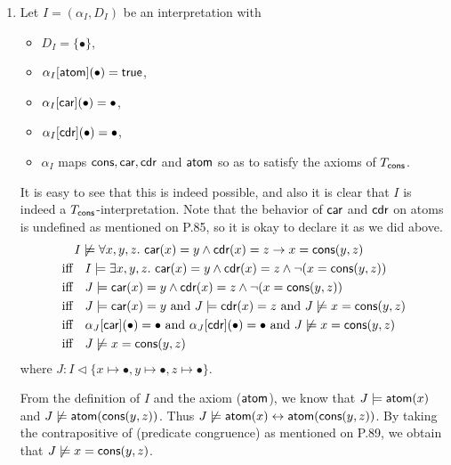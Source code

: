 \begin{exer}[3.4]
    $ $
    \begin{enumerate}[label=(\alph*)]
        \item
            Let $I = (\alpha_I, D_I)$ be an interpretation with
            \begin{itemize}
                \item
                    $D_I = \{ \bullet \}$,
                \item
                    $\alpha_I[\operatorname{\textsf{atom}}](\bullet) = \operatorname{\textsf{true}}$,
                \item
                    $\alpha_I[\operatorname{\textsf{car}}](\bullet) = \bullet$,
                \item
                    $\alpha_I[\operatorname{\textsf{cdr}}](\bullet) = \bullet$,
                \item
                    $\alpha_I$ maps $\operatorname{\textsf{cons}}, \operatorname{\textsf{car}}, \operatorname{\textsf{cdr}}$ and $\operatorname{\textsf{atom}}$ so as to satisfy the axioms of $T_{\operatorname{\textsf{cons}}}$.
            \end{itemize}
            It is easy to see that this is indeed possible, and also it is clear that $I$ is indeed a $T_{\operatorname{\textsf{cons}}}$-interpretation.
            Note that the behavior of $\operatorname{\textsf{car}}$ and $\operatorname{\textsf{cdr}}$ on atoms is undefined as mentioned on P.85, so it is okay to declare it as we did above.
            \begin{align*}
                & \quad I \not\models \forall x, y, z.\, \operatorname{\textsf{car}}(x) = y \land \operatorname{\textsf{cdr}}(x) = z \rightarrow x = \operatorname{\textsf{cons}}(y, z) \\
                & \text{iff}\quad I \models \exists x, y, z.\, \operatorname{\textsf{car}}(x) = y \land \operatorname{\textsf{cdr}}(x) = z \land \neg(x = \operatorname{\textsf{cons}}(y, z)) \\
                & \text{iff}\quad J \models \operatorname{\textsf{car}}(x) = y \land \operatorname{\textsf{cdr}}(x) = z \land \neg(x = \operatorname{\textsf{cons}}(y, z)) \\
                & \text{iff}\quad J \models \operatorname{\textsf{car}}(x) = y \text{ and } J \models \operatorname{\textsf{cdr}}(x) = z \text{ and } J \not\models x = \operatorname{\textsf{cons}}(y, z) \\
                & \text{iff}\quad \alpha_J[\operatorname{\textsf{car}}](\bullet) = \bullet \text{ and }
                                  \alpha_J[\operatorname{\textsf{cdr}}](\bullet) = \bullet \text{ and }
                                  J \not\models x = \operatorname{\textsf{cons}}(y, z) \\
                & \text{iff}\quad J \not\models x = \operatorname{\textsf{cons}}(y, z)
            \end{align*}
            where $J: I \vartriangleleft \{ x \mapsto \bullet, y \mapsto \bullet, z \mapsto \bullet \}$.

            From the definition of $I$ and the axiom ($\operatorname{\textsf{atom}}$), we know that $J \models \operatorname{\textsf{atom}}(x)$ and $J \not\models \operatorname{\textsf{atom}}(\operatorname{\textsf{cons}}(y, z))$.
            Thus $J \not\models \operatorname{\textsf{atom}}(x) \leftrightarrow \operatorname{\textsf{atom}}(\operatorname{\textsf{cons}}(y, z))$.
            By taking the contrapositive of (\textsf{predicate congruence}) as mentioned on P.89, we obtain that $J \not\models x = \operatorname{\textsf{cons}}(y, z)$.


\end{enumerate}
\end{exer}
